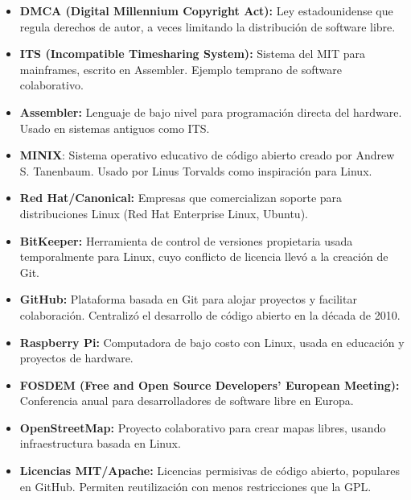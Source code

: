 \documentclass[a4paper,12pt]{article}
\begin{document}
\begin{itemize}
    \item \textbf{DMCA (Digital Millennium Copyright Act):} Ley estadounidense que regula derechos de autor, a veces limitando la distribución de software libre.
    \label{dmca}

    \item \textbf{ITS (Incompatible Timesharing System):} Sistema del MIT para mainframes, escrito en Assembler. Ejemplo temprano de software colaborativo.
    \label{its}

    \item \textbf{Assembler:} Lenguaje de bajo nivel para programación directa del hardware. Usado en sistemas antiguos como ITS.
    \label{assembler}

    \item \textbf{MINIX}: Sistema operativo educativo de código abierto creado por Andrew S. Tanenbaum. Usado por Linus Torvalds como inspiración para Linux.
    \label{minix}

    \item \textbf{Red Hat/Canonical:} Empresas que comercializan soporte para distribuciones Linux (Red Hat Enterprise Linux, Ubuntu).
    \label{redhatcanonical}

    \item \textbf{BitKeeper:} Herramienta de control de versiones propietaria usada temporalmente para Linux, cuyo conflicto de licencia llevó a la creación de Git.
    \label{bitkeeper}

    \item \textbf{GitHub:} Plataforma basada en Git para alojar proyectos y facilitar colaboración. Centralizó el desarrollo de código abierto en la década de 2010.
    \label{github}

    \item \textbf{Raspberry Pi:} Computadora de bajo costo con Linux, usada en educación y proyectos de hardware.
    \label{raspberrypi}

    \item \textbf{FOSDEM (Free and Open Source Developers' European Meeting):} Conferencia anual para desarrolladores de software libre en Europa.
    \label{fosdem}

    \item \textbf{OpenStreetMap:} Proyecto colaborativo para crear mapas libres, usando infraestructura basada en Linux.
    \label{openstreetmap}

    \item \textbf{Licencias MIT/Apache:} Licencias permisivas de código abierto, populares en GitHub. Permiten reutilización con menos restricciones que la GPL.
    \label{mitapache}


\end{itemize}
\end{document}
